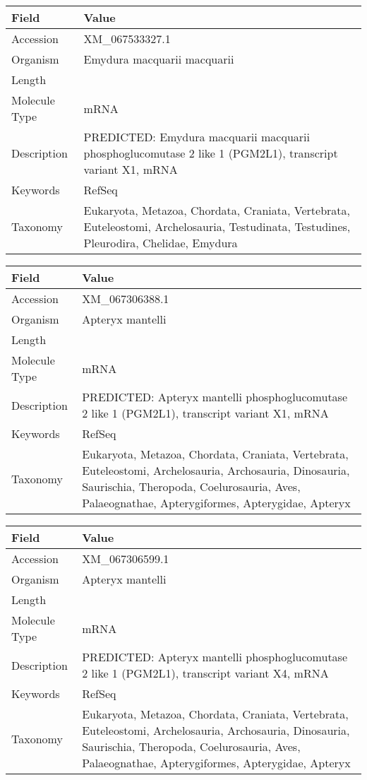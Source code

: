 \documentclass[10pt]{article}
\begin{document}
{\footnotesize
\begin{longtable}{>{\raggedright\arraybackslash}p{4.5cm} >{\raggedright\arraybackslash}p{11.5cm}}
\textbf{Field} & \textbf{Value} \\
\hline
Accession & XM\_067533327.1 \\
Organism & Emydura macquarii macquarii \\
Length & 9001 \\
Molecule Type & mRNA \\
Description & PREDICTED: Emydura macquarii macquarii phosphoglucomutase 2 like 1 (PGM2L1), transcript variant X1, mRNA \\
Keywords & RefSeq \\
Taxonomy & Eukaryota, Metazoa, Chordata, Craniata, Vertebrata, Euteleostomi, Archelosauria, Testudinata, Testudines, Pleurodira, Chelidae, Emydura \\
\end{longtable}
}

{\footnotesize
\begin{longtable}{>{\raggedright\arraybackslash}p{4.5cm} >{\raggedright\arraybackslash}p{11.5cm}}
\textbf{Field} & \textbf{Value} \\
\hline
Accession & XM\_067306388.1 \\
Organism & Apteryx mantelli \\
Length & 6489 \\
Molecule Type & mRNA \\
Description & PREDICTED: Apteryx mantelli phosphoglucomutase 2 like 1 (PGM2L1), transcript variant X1, mRNA \\
Keywords & RefSeq \\
Taxonomy & Eukaryota, Metazoa, Chordata, Craniata, Vertebrata, Euteleostomi, Archelosauria, Archosauria, Dinosauria, Saurischia, Theropoda, Coelurosauria, Aves, Palaeognathae, Apterygiformes, Apterygidae, Apteryx \\
\end{longtable}
}

{\footnotesize
\begin{longtable}{>{\raggedright\arraybackslash}p{4.5cm} >{\raggedright\arraybackslash}p{11.5cm}}
\textbf{Field} & \textbf{Value} \\
\hline
Accession & XM\_067306599.1 \\
Organism & Apteryx mantelli \\
Length & 6288 \\
Molecule Type & mRNA \\
Description & PREDICTED: Apteryx mantelli phosphoglucomutase 2 like 1 (PGM2L1), transcript variant X4, mRNA \\
Keywords & RefSeq \\
Taxonomy & Eukaryota, Metazoa, Chordata, Craniata, Vertebrata, Euteleostomi, Archelosauria, Archosauria, Dinosauria, Saurischia, Theropoda, Coelurosauria, Aves, Palaeognathae, Apterygiformes, Apterygidae, Apteryx \\
\end{longtable}
}
\end{document}

